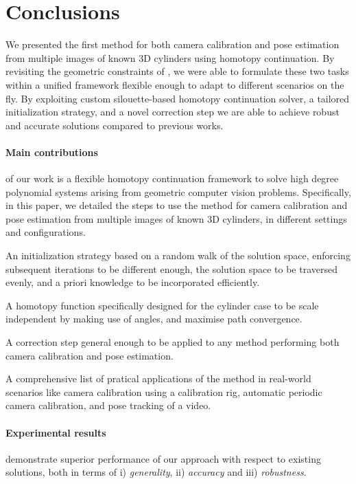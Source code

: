 \section{Conclusions}
\label{sec:conclusions}

We presented the first method for both camera calibration and pose estimation from multiple images of known 3D cylinders using homotopy continuation.
By revisiting the geometric constraints of \cite{gummeson22pose}, we were able to  formulate these two tasks within a unified framework flexible enough to adapt to different scenarios on the fly. By exploiting custom silouette-based homotopy continuation solver, a tailored initialization strategy, and a novel correction step we are able to achieve robust and accurate solutions compared to previous works. 

\paragraph{Main contributions} of our work is a flexible homotopy continuation framework to solve high degree polynomial systems arising from geometric computer vision problems.
Specifically, in this paper, we detailed the steps to use the method for camera calibration and pose estimation from multiple images of known 3D cylinders, in different settings and configurations.

An initialization strategy based on a random walk of the solution space, enforcing subsequent iterations to be different enough, the solution space to be traversed evenly, and a priori knowledge to be incorporated efficiently.

A homotopy function specifically designed for the cylinder case to be scale independent by making use of angles, and maximise path convergence.

A correction step general enough to be applied to any method performing both camera calibration and pose estimation.

A comprehensive list of pratical applications of the method in real-world scenarios like camera calibration using a calibration rig, automatic periodic camera calibration, and pose tracking of a video.

\paragraph{Experimental results} demonstrate superior performance of our approach with respect  to existing solutions, both in terms of i) \emph{generality},  ii) \emph{accuracy} and iii) \emph{robustness}.

